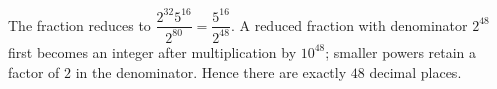 The fraction reduces to $\dfrac{2^{32}5^{16}}{2^{80}}=\dfrac{5^{16}}{2^{48}}$. A reduced fraction with denominator $2^{48}$ first becomes an integer after multiplication by $10^{48}$; smaller powers retain a factor of $2$ in the denominator. Hence there are exactly $\boxed{48}$ decimal places.
